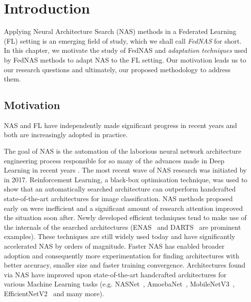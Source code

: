 \chapter{Introduction}\label{chapter:introduction}

Applying Neural Architecture Search (NAS) methods in a Federated Learning (FL) setting is an emerging field of study, which we shall call \textit{FedNAS} for short. In this chapter, we motivate the study of FedNAS and \textit{adaptation techniques} used by FedNAS methods to adapt NAS to the FL setting. Our motivation leads us to our research questions and ultimately, our proposed methodology to address them.

\section{Motivation}

NAS and FL have independently made significant progress in recent years and both are increasingly adopted in practice. 

The goal of NAS is the automation of the laborious neural network architecture engineering process responsible for so many of the advances made in Deep Learning in recent years \cite{nas_survey_2019}. The most recent wave of NAS research was initiated by \cite{nas_with_rl_2017} in 2017. Reinforcement Learning, a black-box optimisation technique, was used to show that an automatically searched architecture can outperform handcrafted state-of-the-art architectures for image classification. NAS methods proposed early on were inefficient and a significant amount of research attention improved the situation soon after. Newly developed efficient techniques tend to make use of the internals of the searched architectures (ENAS~\cite{enas_2018} and DARTS~\cite{darts_2019} are prominent examples). These techniques are still widely used today and have significantly accelerated NAS by orders of magnitude. Faster NAS has enabled broader adoption and consequently more experimentation for finding architectures with better accuracy, smaller size and faster training convergence. Architectures found via NAS have improved upon state-of-the-art handcrafted architectures for various Machine Learning tasks (e.g. NASNet~\cite{nasnet_2018}, AmoebaNet~\cite{amoebanet_2019}, MobileNetV3~\cite{mobilenetv3_2019}, EfficientNetV2~\cite{efficientnetv2_2021} and many more).

